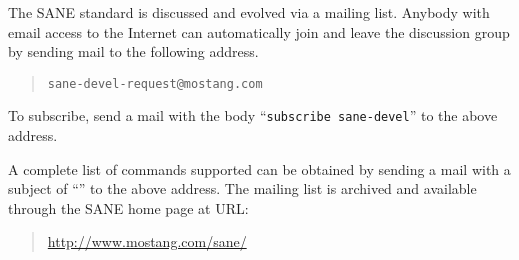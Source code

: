 \documentclass[11pt,DVIps]{report}
\begin{document}
The SANE standard is discussed and evolved via a mailing list.
Anybody with email access to the Internet can automatically join and
leave the discussion group by sending mail to the following address.
\begin{quote}
\begin{verbatim}
sane-devel-request@mostang.com
\end{verbatim}
\end{quote}
To subscribe, send a mail with the body ``\verb|subscribe sane-devel|'' to the
above address.

A complete list of commands supported can be obtained by sending a
mail with a subject of ``'' to the above address.  The
mailing list is archived and available through the SANE home page at
URL:
\begin{quote}
\url{http://www.mostang.com/sane/}
\end{quote}

\newpage

\end{document}
